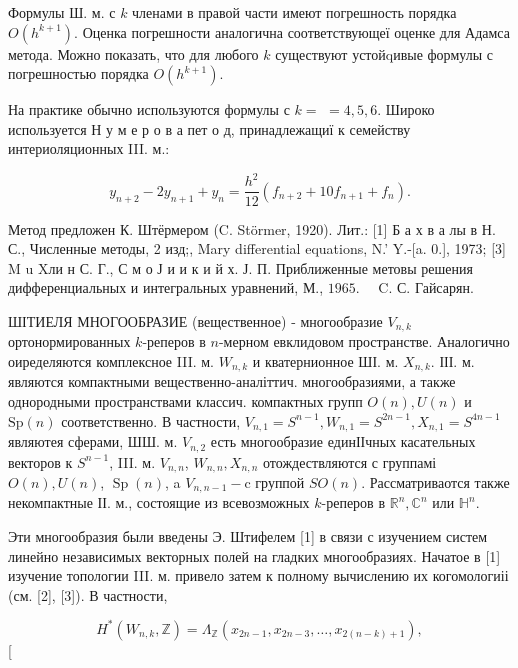 \documentclass[10pt]{article}
\begin{document}
Формулы Ш. м. с $k$ членами в правой части имеют погрешность порядка $O\left(h^{k+1}\right)$. Оценка погрешности аналогична соответствующеї оценке для Адамса метода. Можно показать, что для любого $k$ существуют устойqивые формулы с погрешностью порядка $O\left(h^{k+1}\right)$.



На практике обычно используются формулы с $k=$ $=4,5,6$. Широко используется Н у м е р о в а пет о д, принадлежащиї к семейству интериоляционных III. м.:



\[

y_{n+2}-2 y_{n+1}+y_{n}=\frac{h^{2}}{12}\left(f_{n+2}+10 f_{n+1}+f_{n}\right) .

\]



Метод предложен К. Штёрмером (C. Störmer, 1920). Лит.: [1] Б а х в а лы в Н. С., Численные методы, 2 изд;, Mary differential equations, N.' Y.-[a. 0.], 1973; [3] M u Xли н С. Г., С м о Ј и и к и й х. Ј. П. Приближенные метовы решения дифференциальных и интегральных уравнений, М., $1965 . \quad$ C. С. Гайсарян.



ШІТИЕЛЯ МНОГООБРАЗИЕ (вещественное) - многообразие $V_{n, k}$ ортонормированных $k$-реперов в $n$-мерном евклидовом пространстве. Аналогично оиределяются комплексное III. м. $W_{n, k}$ и кватернионное ШІ. м. $X_{n, k}$. ІІІ. м. являются компактными вещественно-аналіттич. многообразиями, а также однородными пространствами классич. компактных групп $O(n), U(n)$ и $\mathrm{Sp}(n)$ соответственно. В частности, $V_{n, 1}=S^{n-1}, W_{n, 1}=S^{2 n-1}, X_{n, 1}=S^{4 n-1}$ являютея сферами, ШШ. м. $V_{n, 2}$ есть многообразие единІІчных касательных векторов к $S^{n-1}$, III. м. $V_{n, n}$, $W_{n, n}, X_{n, n}$ отождествляются с группамі $O(n), U(n)$, $\operatorname{Sp}(n)$, a $V_{n, n-1}-\mathrm{c}$ группой $S O(n)$. Рассматриваотся также некомпактные ІІ. м., состоящие из всевозможных $k$-реперов в $\mathbb{R}^{n}, \mathbb{C}^{n}$ или $\mathbb{H}^{n}$.



Эти многообразия были введены Э. Штифелем [1] в связи с изучением систем линейно независимых векторных полей на гладких многообразиях. Начатое в [1] изучение топологии III. м. привело затем к полному вычислению их когомологиіі (см. [2], [3]). В частности,



\[

H^{*}\left(W_{n, k}, \mathbb{Z}\right)=\Lambda_{\mathbb{Z}}\left(x_{2 n-1}, x_{2 n-3}, \ldots, x_{2(n-k)+1}\right),

\][
\end{document}
